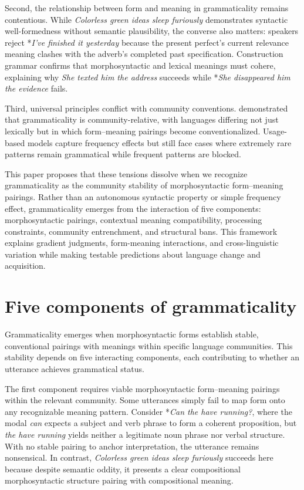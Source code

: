 \documentclass[12pt]{article}
\begin{document}
Second, the relationship between form and meaning in grammaticality remains contentious. While \textit{Colorless green ideas sleep furiously} demonstrates syntactic well-formedness without semantic plausibility, the converse also matters: speakers reject *\textit{I've finished it yesterday} because the present perfect's current relevance meaning clashes with the adverb's completed past specification. Construction grammar \parencite{goldberg1995constructions} confirms that morphosyntactic and lexical meanings must cohere, explaining why \textit{She texted him the address} succeeds while *\textit{She disappeared him the evidence} fails.

Third, universal principles conflict with community conventions. \textcite{labov1972} demonstrated that grammaticality is community-relative, with languages differing not just lexically but in which form–meaning pairings become conventionalized. Usage-based models capture frequency effects but still face cases where extremely rare patterns remain grammatical while frequent patterns are blocked.

This paper proposes that these tensions dissolve when we recognize grammaticality as the community stability of morphosyntactic form–meaning pairings. Rather than an autonomous syntactic property or simple frequency effect, grammaticality emerges from the interaction of five components: morphosyntactic pairings, contextual meaning compatibility, processing constraints, community entrenchment, and structural bans. This framework explains gradient judgments, form-meaning interactions, and cross-linguistic variation while making testable predictions about language change and acquisition.

\section{Five components of grammaticality}

Grammaticality emerges when morphosyntactic forms establish stable, conventional pairings with meanings within specific language communities. This stability depends on five interacting components, each contributing to whether an utterance achieves grammatical status.

The first component requires viable morphosyntactic form–meaning pairings within the relevant community. Some utterances simply fail to map form onto any recognizable meaning pattern. Consider *\textit{Can the have running?}, where the modal \textit{can} expects a subject and verb phrase to form a coherent proposition, but \textit{the have running} yields neither a legitimate noun phrase nor verbal structure. With no stable pairing to anchor interpretation, the utterance remains nonsensical. In contrast, \textit{Colorless green ideas sleep furiously} succeeds here because despite semantic oddity, it presents a clear compositional morphosyntactic structure pairing with compositional meaning.
\end{document}
